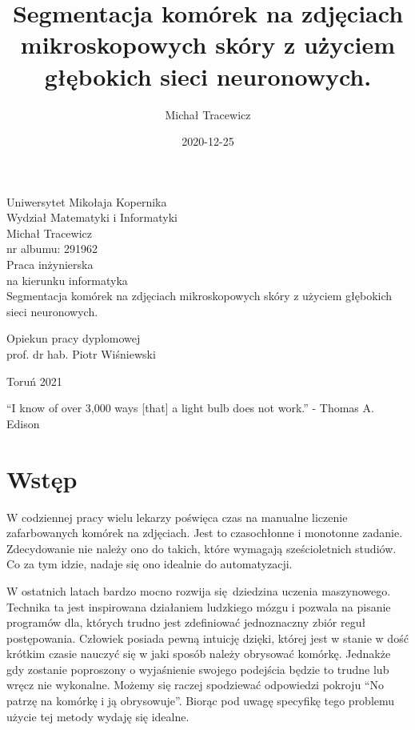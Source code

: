 \documentclass{article}
\title{Segmentacja komórek na zdjęciach mikroskopowych skóry z użyciem głębokich sieci neuronowych.}
\date{2020-12-25}
\author{Michał Tracewicz}
\begin{document}
\begin{titlepage}
    \begin{center}
        {\large Uniwersytet Mikołaja Kopernika\\}
        {\large Wydział Matematyki i Informatyki\\}
        \vspace{2.1cm}
        {\large Michał Tracewicz\\}
        nr albumu: 291962\\
        \vspace{2cm}
        Praca inżynierska\\
        na kierunku informatyka\\
        \vspace{2cm}
        {\huge Segmentacja komórek na zdjęciach mikroskopowych skóry z użyciem głębokich sieci neuronowych.\\}
    \end{center}
    \hfill
    \begin{minipage}{6cm}
        \vspace{12mm}
        {
            Opiekun pracy dyplomowej\\
            prof. dr hab. Piotr Wiśniewski
        }
    \end{minipage}
    \vspace{2cm}
    \begin{center}
        {Toruń 2021\\}
    \end{center}
    \vspace{1.2cm}
\end{titlepage}
\newpage
\tableofcontents
\newpage
\hspace{0pt}
\vfill
{\huge{``I know of over 3,000 ways [that] a light bulb does not work.'' - Thomas A. Edison}}
\vfill
\hspace{0pt}
\newpage
\section{Wstęp}
W codziennej pracy wielu lekarzy poświęca czas na manualne liczenie zafarbowanych komórek na zdjęciach.
Jest to czasochłonne i monotonne zadanie.
Zdecydowanie nie należy ono do takich, które wymagają sześcioletnich studiów.
Co za tym idzie, nadaje się ono idealnie do automatyzacji.

W ostatnich latach bardzo mocno rozwija się dziedzina uczenia maszynowego.
Technika ta jest inspirowana działaniem ludzkiego mózgu i pozwala na pisanie programów dla, których trudno jest zdefiniować jednoznaczny zbiór reguł postępowania.
Człowiek posiada pewną intuicję dzięki, której jest w stanie w dość krótkim czasie nauczyć się w jaki sposób należy obrysować komórkę.
Jednakże gdy zostanie poproszony o wyjaśnienie swojego podejścia będzie to trudne lub wręcz nie wykonalne.
Możemy się raczej spodziewać odpowiedzi pokroju ``No patrzę na komórkę i ją obrysowuje''.
Biorąc pod uwagę specyfikę tego problemu użycie tej metody wydaję się idealne.
\end{document}

